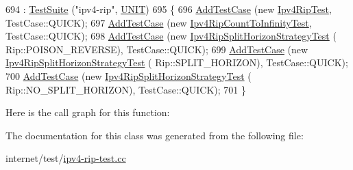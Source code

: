 \begin{DoxyCode}
694                       : \hyperlink{classns3_1_1TestSuite_a904b0c40583b744d30908aeb94636d1a}{TestSuite} (\textcolor{stringliteral}{"ipv4-rip"}, \hyperlink{classns3_1_1TestSuite_a1ebfcab34ec8161e085e8e3a1855eae0a3885375a3787abf60431f8454b3cadbd}{UNIT})
695   \{
696     \hyperlink{classns3_1_1TestCase_a3718088e3eefd5d6454569d2e0ddd835}{AddTestCase} (\textcolor{keyword}{new} \hyperlink{classIpv4RipTest}{Ipv4RipTest}, TestCase::QUICK);
697     \hyperlink{classns3_1_1TestCase_a3718088e3eefd5d6454569d2e0ddd835}{AddTestCase} (\textcolor{keyword}{new} \hyperlink{classIpv4RipCountToInfinityTest}{Ipv4RipCountToInfinityTest}, TestCase::QUICK);
698     \hyperlink{classns3_1_1TestCase_a3718088e3eefd5d6454569d2e0ddd835}{AddTestCase} (\textcolor{keyword}{new} \hyperlink{classIpv4RipSplitHorizonStrategyTest}{Ipv4RipSplitHorizonStrategyTest} (
      Rip::POISON\_REVERSE), TestCase::QUICK);
699     \hyperlink{classns3_1_1TestCase_a3718088e3eefd5d6454569d2e0ddd835}{AddTestCase} (\textcolor{keyword}{new} \hyperlink{classIpv4RipSplitHorizonStrategyTest}{Ipv4RipSplitHorizonStrategyTest} (
      Rip::SPLIT\_HORIZON), TestCase::QUICK);
700     \hyperlink{classns3_1_1TestCase_a3718088e3eefd5d6454569d2e0ddd835}{AddTestCase} (\textcolor{keyword}{new} \hyperlink{classIpv4RipSplitHorizonStrategyTest}{Ipv4RipSplitHorizonStrategyTest} (
      Rip::NO\_SPLIT\_HORIZON), TestCase::QUICK);
701   \}
\end{DoxyCode}


Here is the call graph for this function\+:




The documentation for this class was generated from the following file\+:\begin{DoxyCompactItemize}
\item 
internet/test/\hyperlink{ipv4-rip-test_8cc}{ipv4-\/rip-\/test.\+cc}\end{DoxyCompactItemize}

